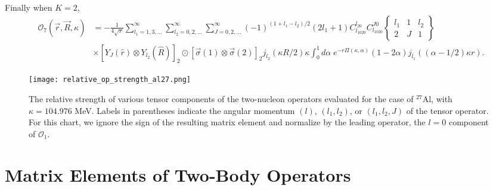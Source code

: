 \documentclass{book}[12pt]
\begin{document}
Finally when $K=2$,
\begin{equation}
\begin{split}
\mathcal{O}_7(\vec{r},\vec{R},\kappa)&=-\frac{1}{4\sqrt{\pi}}\sum_{l_1=1,3,...}^{\infty}\sum_{l_2=0,2,...}^{\infty}\sum_{J=0,2,...}^{\infty}(-1)^{(1+l_1-l_2)/2}(2l_1+1)C_{l_1020}^{l_20}C_{l_1020}^{J0}\left\{\begin{array}{ccc}
l_1 & 1 & l_2\\
2 & J & 1
\end{array}\right\}\\
&\times \left[Y_J(\hat{r})\otimes Y_{l_2}(\hat{R})\right]_2\odot\left[\vec{\sigma}(1)\otimes\vec{\sigma}(2)\right]_2 j_{l_2}(\kappa R/2)\kappa \int_0^1d\alpha\;e^{-r\Pi(\kappa,\alpha)}(1-2\alpha)j_{l_1}((\alpha-1/2)\kappa r).
\end{split}
\end{equation}
\begin{figure*}
\texttt{[image: relative\_op\_strength\_al27.png]}
\caption{The relative strength of various tensor components of the two-nucleon operators evaluated for the case of $^{27}$Al, with $\kappa = 104.976$ MeV. Labels in parentheses indicate the angular momentum $(l)$, $(l_1, l_2)$, or $(l_1, l_2,J)$ of the tensor operator. For this chart, we ignore the sign of the resulting matrix element and normalize by the leading operator, the $l=0$ component of $\mathcal{O}_1$.}
\label{fig:rel_op_str}
\end{figure*}
\chapter{Matrix Elements of Two-Body Operators}
\end{document}
